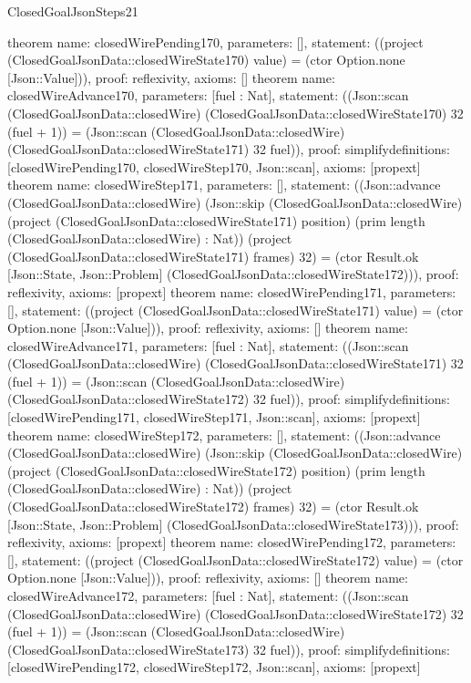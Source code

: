 \begin{lexlean}{ClosedGoalJsonSteps21}
\begin{semanticmodule}
{}
theorem{
 name: closedWirePending170, parameters: [],
 statement: ((project (ClosedGoalJsonData::closedWireState170) value) = (ctor Option.none [Json::Value])), proof: reflexivity{}, axioms: []
}
theorem{
 name: closedWireAdvance170, parameters: [fuel : Nat],
 statement: ((Json::scan (ClosedGoalJsonData::closedWire) (ClosedGoalJsonData::closedWireState170) 32 (fuel + 1)) = (Json::scan (ClosedGoalJsonData::closedWire) (ClosedGoalJsonData::closedWireState171) 32 fuel)), proof: simplify{definitions: [closedWirePending170, closedWireStep170, Json::scan]}, axioms: [propext]
}
theorem{
 name: closedWireStep171, parameters: [],
 statement: ((Json::advance (ClosedGoalJsonData::closedWire) (Json::skip (ClosedGoalJsonData::closedWire) (project (ClosedGoalJsonData::closedWireState171) position) (prim length (ClosedGoalJsonData::closedWire) : Nat)) (project (ClosedGoalJsonData::closedWireState171) frames) 32) = (ctor Result.ok [Json::State, Json::Problem] (ClosedGoalJsonData::closedWireState172))), proof: reflexivity{}, axioms: [propext]
}
theorem{
 name: closedWirePending171, parameters: [],
 statement: ((project (ClosedGoalJsonData::closedWireState171) value) = (ctor Option.none [Json::Value])), proof: reflexivity{}, axioms: []
}
theorem{
 name: closedWireAdvance171, parameters: [fuel : Nat],
 statement: ((Json::scan (ClosedGoalJsonData::closedWire) (ClosedGoalJsonData::closedWireState171) 32 (fuel + 1)) = (Json::scan (ClosedGoalJsonData::closedWire) (ClosedGoalJsonData::closedWireState172) 32 fuel)), proof: simplify{definitions: [closedWirePending171, closedWireStep171, Json::scan]}, axioms: [propext]
}
theorem{
 name: closedWireStep172, parameters: [],
 statement: ((Json::advance (ClosedGoalJsonData::closedWire) (Json::skip (ClosedGoalJsonData::closedWire) (project (ClosedGoalJsonData::closedWireState172) position) (prim length (ClosedGoalJsonData::closedWire) : Nat)) (project (ClosedGoalJsonData::closedWireState172) frames) 32) = (ctor Result.ok [Json::State, Json::Problem] (ClosedGoalJsonData::closedWireState173))), proof: reflexivity{}, axioms: [propext]
}
theorem{
 name: closedWirePending172, parameters: [],
 statement: ((project (ClosedGoalJsonData::closedWireState172) value) = (ctor Option.none [Json::Value])), proof: reflexivity{}, axioms: []
}
theorem{
 name: closedWireAdvance172, parameters: [fuel : Nat],
 statement: ((Json::scan (ClosedGoalJsonData::closedWire) (ClosedGoalJsonData::closedWireState172) 32 (fuel + 1)) = (Json::scan (ClosedGoalJsonData::closedWire) (ClosedGoalJsonData::closedWireState173) 32 fuel)), proof: simplify{definitions: [closedWirePending172, closedWireStep172, Json::scan]}, axioms: [propext]
}
\end{semanticmodule}
\end{lexlean}

